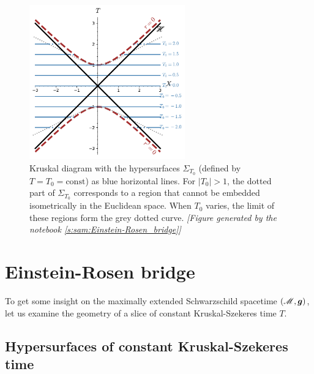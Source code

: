 
\begin{figure}
\centerline{\includegraphics[width=0.6\textwidth]{max_constant_T_slices.pdf}}
\caption[]{\label{f:max:constant_T_slices} \footnotesize
Kruskal diagram with the hypersurfaces $\Sigma_{T_0}$ (defined by $T=T_0 = \mathrm{const}$) as blue horizontal lines. For $|T_0|>1$, the dotted part of
$\Sigma_{T_0}$ corresponds to a region that cannot be embedded isometrically in
the Euclidean space. When $T_0$ varies, the limit of these regions form
the grey dotted curve.
\textsl{[Figure generated by the notebook \ref{s:sam:Einstein-Rosen_bridge}]}
}
\end{figure}

\section{Einstein-Rosen bridge} \label{s:max:ER_bridge}

To get some insight on the maximally extended Schwarzschild
spacetime $(\mathscr{M},\bm{g})$, let us examine the geometry of a slice of constant
Kruskal-Szekeres time $T$.

\subsection{Hypersurfaces of constant Kruskal-Szekeres time} \label{s:max:hyp_const_T}

